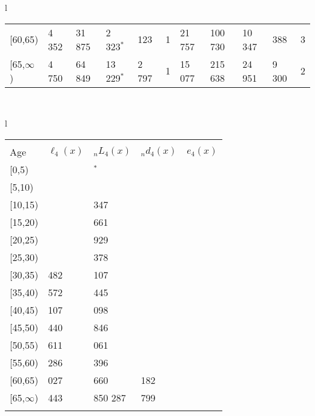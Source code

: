\documentclass[
]{article}
\begin{document}
\begin{table}
\begin{tabular}[t]{l}
\begin{tabular}
{}[60,65) & 4 352 & 31 875 & 2 323$^{*}$ & 123 & 1 & 21 757 & 100 730 & 10 347 & 388 & 3\\
{}[65,$\infty$) & 4 750 & 64 849 & 13 229$^{*}$ & 2 797 & 1 & 15 077 & 215 638 & 24 951 & 9 300 & 2\\
\end{tabular}\\
\end{tabular}
\centering
\begin{tabular}[t]{l}
\hline
\begin{tabular}{>{\raggedright\arraybackslash}p{.43in}>{\raggedleft\arraybackslash}p{1.3in}>{\raggedleft\arraybackslash}p{1.3in}>{\raggedleft\arraybackslash}p{1.3in}>{\raggedleft\arraybackslash}p{1.3in}}
\toprule
\multicolumn{1}{c}{ } & \multicolumn{4}{c}{(4) Lost both} \\
\cmidrule(l{3pt}r{3pt}){2-5}
Age & $\ell_{4}(x)$ & ${}_nL_{4}(x)$ & ${}_nd_{4}(x)$ & $e_{4}(x)$\\
\midrule
{}[0,5) & 0 & 174$^{*}$ & 0 & 27\\
{}[5,10) & 113 & 879 & 0 & 27\\
{}[10,15) & 203 & 1 347 & 0 & 27\\
{}[15,20) & 272 & 1 661 & 0 & 27\\
{}[20,25) & 331 & 2 929 & 1 & 27\\
\addlinespace
{}[25,30) & 751 & 6 378 & 2 & 27\\
{}[30,35) & 1 482 & 12 107 & 4 & 27\\
{}[35,40) & 2 572 & 22 445 & 9 & 27\\
{}[40,45) & 5 107 & 49 098 & 31 & 27\\
{}[45,50) & 11 440 & 87 846 & 91 & 26\\
\addlinespace
{}[50,55) & 16 611 & 146 061 & 246 & 26\\
{}[55,60) & 29 286 & 218 396 & 533 & 24\\
{}[60,65) & 39 027 & 306 660 & 1 182 & 22\\
{}[65,$\infty$) & 52 443 & 1 850 287 & 79 799 & 20\\
\bottomrule
\multicolumn{5}{l}{\rule{0pt}{1em}\textsuperscript{*} Based on an estimated from SIPP with less than 10 respondents in the numerator.}\\
\end{tabular}\\
\end{tabular}
\end{table}
\end{document}
